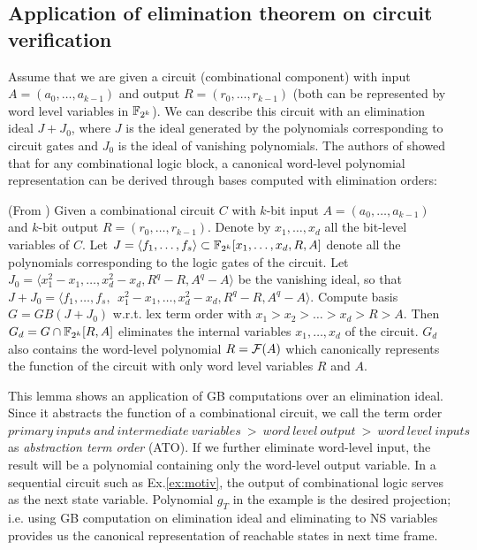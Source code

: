 \subsection{Application of elimination theorem on circuit verification}
\label{sec:elim}
Assume that we are given a circuit (combinational component) with input $A = (a_0,\dots,a_{k-1})$ and output 
$R = (r_0,\dots,r_{k-1})$ (both can be represented
by word level variables in ${\mathbb{F}}_{2^k}$). We can describe this circuit with an elimination ideal $J+J_0$, where
$J$ is the ideal generated by the polynomials corresponding to circuit gates and $J_0$ is the ideal of vanishing polynomials.
The authors of \cite{timDAC} showed that for any combinational
logic block, a canonical word-level polynomial representation can be
derived through \Grobner bases computed with elimination orders:
\begin{lemma}
(From \cite{timDAC}) Given a combinational circuit $C$ with $k$-bit
  input $A = (a_0, \dots, a_{k-1})$ and $k$-bit output $R = (r_0, \dots,
  r_{k-1})$. Denote by $x_1, \dots, x_d$ all the bit-level
  variables of   $C$. Let $J = \langle f_1, \dots, f_s \rangle \subset
  {\mathbb{F}}_{2^k}[x_1, \dots, x_d, R, A]$ denote all the polynomials corresponding to the
  logic gates of the circuit. Let $J_0 = \langle x_1^2 - x_1, \dots,
  x_d^2 - x_d, R^q - R, A^q - A \rangle$ be the vanishing ideal, so
  that $J + J_0 = \langle f_1, \dots, f_s, ~~ x_1^2 - x_1, \dots,
  x_d^2 - x_d, R^q - R, A^q - A \rangle$. Compute \Grobner basis $G =
  GB(J + J_0)$ w.r.t. lex term order with $x_1 > x_2 > \dots > x_d > R
  > A$. Then $G_d = G \cap {\mathbb{F}}_{2^k}[R, A]$ eliminates the internal
  variables $x_1, \dots, x_d$ of the circuit. $G_d$ also contains the
  word-level polynomial $R = {\mathcal{F}}(A)$ which canonically represents the
  function of the circuit with only word level variables $R$ and $A$.
\end{lemma}
This lemma shows an application of GB computations over an elimination ideal.
Since it abstracts the function of a combinational circuit, we call the term order
$primary~inputs~and~intermediate~variables~>~word~level~output~>~word~level~inputs$
as \textit{abstraction term order} (ATO).
If we further eliminate word-level input, the result will be a polynomial containing only 
the word-level output variable. In a sequential circuit
such as Ex.\ref{ex:motiv}, the output of combinational logic serves as the next state variable. Polynomial $g_T$ in
the example is the desired projection; i.e. using GB computation on elimination ideal and eliminating to NS
variables provides us the canonical representation of reachable states in next time frame.



